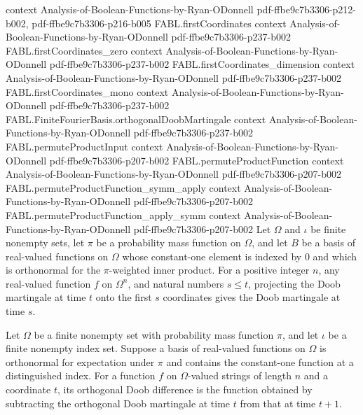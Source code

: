 \begin{theorem}
  {context}
  {Analysis-of-Boolean-Functions-by-Ryan-ODonnell}
  {pdf-ffbe9c7b3306-p212-b002,
    pdf-ffbe9c7b3306-p216-b005}
\proofstep
  {FABL.firstCoordinates}
  {context}
  {Analysis-of-Boolean-Functions-by-Ryan-ODonnell}
  {pdf-ffbe9c7b3306-p237-b002}
\proofstep
  {FABL.firstCoordinates_zero}
  {context}
  {Analysis-of-Boolean-Functions-by-Ryan-ODonnell}
  {pdf-ffbe9c7b3306-p237-b002}
\proofstep
  {FABL.firstCoordinates_dimension}
  {context}
  {Analysis-of-Boolean-Functions-by-Ryan-ODonnell}
  {pdf-ffbe9c7b3306-p237-b002}
\proofstep
  {FABL.firstCoordinates_mono}
  {context}
  {Analysis-of-Boolean-Functions-by-Ryan-ODonnell}
  {pdf-ffbe9c7b3306-p237-b002}
\proofstep
  {FABL.FiniteFourierBasis.orthogonalDoobMartingale}
  {context}
  {Analysis-of-Boolean-Functions-by-Ryan-ODonnell}
  {pdf-ffbe9c7b3306-p237-b002}
\proofstep
  {FABL.permuteProductInput}
  {context}
  {Analysis-of-Boolean-Functions-by-Ryan-ODonnell}
  {pdf-ffbe9c7b3306-p207-b002}
\proofstep
  {FABL.permuteProductFunction}
  {context}
  {Analysis-of-Boolean-Functions-by-Ryan-ODonnell}
  {pdf-ffbe9c7b3306-p207-b002}
\proofstep
  {FABL.permuteProductFunction_symm_apply}
  {context}
  {Analysis-of-Boolean-Functions-by-Ryan-ODonnell}
  {pdf-ffbe9c7b3306-p207-b002}
\proofstep
  {FABL.permuteProductFunction_apply_symm}
  {context}
  {Analysis-of-Boolean-Functions-by-Ryan-ODonnell}
  {pdf-ffbe9c7b3306-p207-b002}
Let $\Omega$ and $\iota$ be finite nonempty sets, let $\pi$ be a probability mass
function on $\Omega$, and let $B$ be a basis of real-valued functions on $\Omega$ whose
constant-one element is indexed by $0$ and which is orthonormal for the $\pi$-weighted
inner product. For a positive integer $n$, any real-valued function $f$ on $\Omega^n$,
and natural numbers $s\le t$, projecting the Doob martingale at time $t$ onto the first
$s$ coordinates gives the Doob martingale at time $s$.
\end{theorem}

\begin{definition}
\label{FABL.FiniteFourierBasis.orthogonalDoobDifference}
\leanok
{}
Let $\Omega$ be a finite nonempty set with probability mass function $\pi$, and let
$\iota$ be a finite nonempty index set. Suppose a basis of real-valued functions on
$\Omega$ is orthonormal for expectation under $\pi$ and contains the constant-one
function at a distinguished index. For a function $f$ on $\Omega$-valued strings of
length $n$ and a coordinate $t$, its orthogonal Doob difference is the function obtained
by subtracting the orthogonal Doob martingale at time $t$ from that at time $t+1$.
\end{definition}

